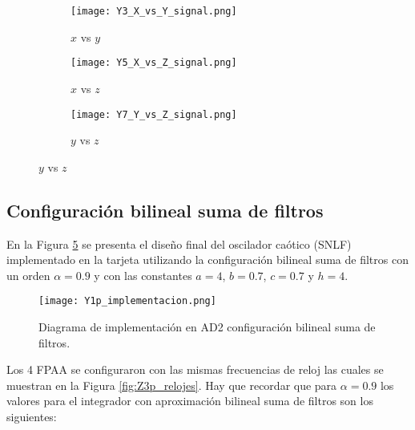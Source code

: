 	\begin{figure}[!ht]
	\caption{Respuesta en el dominio temporal de oscilador caótico con $\alpha = 0.8$ y dos enrollamientos.}
	\label{fig:temporal_imp}
	  \begin{subfigure}[b]{0.3\textwidth}
	    \texttt{[image: Y3\_X\_vs\_Y\_signal.png]}
	    \caption{$x$ vs $y$}
	    \label{fig:Y3_X_vs_Y_signal}
	  \end{subfigure}
	  \hfill
	  \begin{subfigure}[b]{0.3\textwidth}
	    \texttt{[image: Y5\_X\_vs\_Z\_signal.png]}
	    \caption{$x$ vs $z$}
	    \label{fig:Y5_X_vs_Z_signal}
	  \end{subfigure}
	  \hfill
	  \begin{subfigure}[b]{0.3\textwidth}
	    \texttt{[image: Y7\_Y\_vs\_Z\_signal.png]}
	    \caption{$y$ vs $z$}
	    \label{fig:Y7_Y_vs_Z_signal}
	  \end{subfigure}
	\end{figure}
	
	\subsection{Configuración bilineal suma de filtros}
	
	En la Figura \ref{fig:Y1p_implementacion} se presenta el diseño final del oscilador caótico (SNLF) implementado en la tarjeta utilizando la configuración bilineal suma de filtros con un  orden $\alpha = 0.9$ y con las constantes $a =4$, $b = 0.7$, $c = 0.7$ y $h = 4$. 
	
	\begin{figure}[!ht]
		\caption{Diagrama de implementación en AD2 configuración bilineal suma de filtros.} 
		\label{fig:Y1p_implementacion}
		\centering
		\texttt{[image: Y1p\_implementacion.png]}
	\end{figure}
	
	Los 4 FPAA se configuraron con las mismas frecuencias de reloj las cuales se muestran en la Figura \ref{fig:Z3p_relojes}. Hay que recordar que para $\alpha = 0.9$ los valores para el integrador con aproximación bilineal suma de filtros son los siguientes:
	

